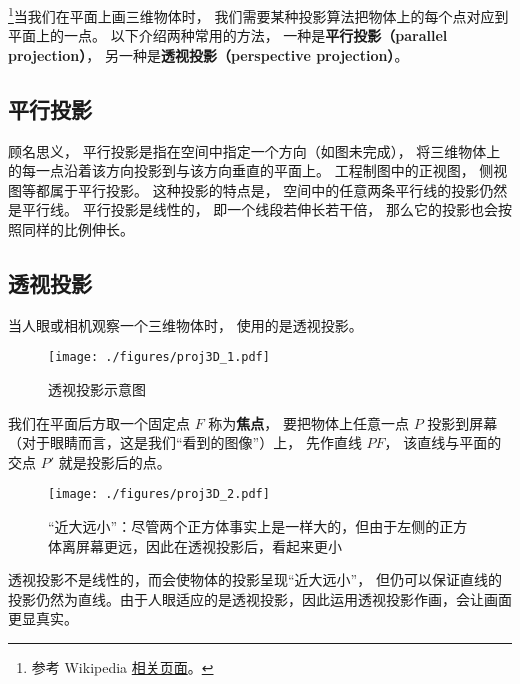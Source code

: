 
\begin{issues}
\issueTODO
\end{issues}

\footnote{参考 Wikipedia \href{https://en.wikipedia.org/wiki/3D_projection}{相关页面}。}当我们在平面上画三维物体时， 我们需要某种投影算法把物体上的每个点对应到平面上的一点。 以下介绍两种常用的方法， 一种是\textbf{平行投影（parallel projection）}， 另一种是\textbf{透视投影（perspective projection）}。


\subsection{平行投影}
顾名思义， 平行投影是指在空间中指定一个方向（如图未完成）， 将三维物体上的每一点沿着该方向投影到与该方向垂直的平面上。 工程制图中的正视图， 侧视图等都属于平行投影。 这种投影的特点是， 空间中的任意两条平行线的投影仍然是平行线。 平行投影是线性的， 即一个线段若伸长若干倍， 那么它的投影也会按照同样的比例伸长。

\subsection{透视投影}
当人眼或相机观察一个三维物体时， 使用的是透视投影。
\begin{figure}[ht]
\centering
\texttt{[image: ./figures/proj3D\_1.pdf]}
\caption{透视投影示意图} \label{proj3D_fig1}
\end{figure}

我们在平面后方取一个固定点 $F$ 称为\textbf{焦点}， 要把物体上任意一点 $P$ 投影到屏幕（对于眼睛而言，这是我们“看到的图像”）上， 先作直线 $PF$， 该直线与平面的交点 $P'$ 就是投影后的点。 

\begin{figure}[ht]
\centering
\texttt{[image: ./figures/proj3D\_2.pdf]}
\caption{“近大远小”：尽管两个正方体事实上是一样大的，但由于左侧的正方体离屏幕更远，因此在透视投影后，看起来更小} \label{proj3D_fig2}
\end{figure}

透视投影不是线性的，而会使物体的投影呈现“近大远小”， 但仍可以保证直线的投影仍然为直线。由于人眼适应的是透视投影，因此运用透视投影作画，会让画面更显真实。

